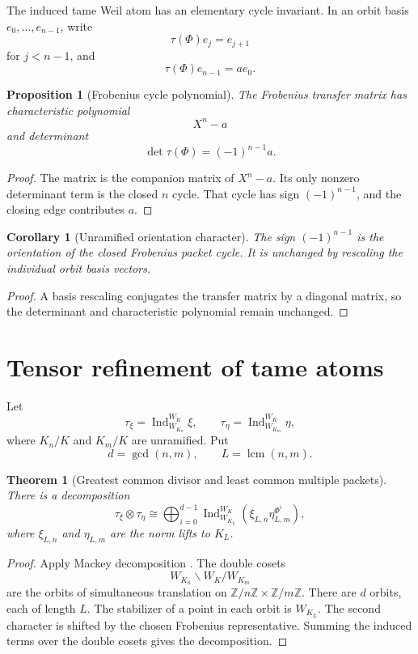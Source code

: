 \documentclass[11pt]{amsart}
\newtheorem{theorem}{Theorem}[section]
\newtheorem{proposition}[proposition]{Proposition}
\newtheorem{corollary}[corollary]{Corollary}
\theoremstyle{definition}
\theoremstyle{remark}
\newcommand{\ZZ}{\mathbb Z}
\newcommand{\Ind}{\operatorname{Ind}}
\newcommand{\lcm}{\operatorname{lcm}}
\begin{document}
The induced tame Weil atom has an elementary cycle invariant. In an orbit basis \(e_0,\ldots,e_{n-1}\), write
\[
\tau(\Phi)e_j=e_{j+1}
\]
for \(j<n-1\), and
\[
\tau(\Phi)e_{n-1}=ae_0.
\]

\begin{proposition}[Frobenius cycle polynomial]\label{prop:frobenius_cycle}
The Frobenius transfer matrix has characteristic polynomial
\[
X^n-a
\]
and determinant
\[
\boxed{
\det\tau(\Phi)=(-1)^{n-1}a.
}
\]
\end{proposition}

\begin{proof}
The matrix is the companion matrix of \(X^n-a\). Its only nonzero determinant term is the closed \(n\) cycle. That cycle has sign \((-1)^{n-1}\), and the closing edge contributes \(a\).
\end{proof}

\begin{corollary}[Unramified orientation character]\label{cor:orientation}
The sign \((-1)^{n-1}\) is the orientation of the closed Frobenius packet cycle. It is unchanged by rescaling the individual orbit basis vectors.
\end{corollary}

\begin{proof}
A basis rescaling conjugates the transfer matrix by a diagonal matrix, so the determinant and characteristic polynomial remain unchanged.
\end{proof}

\section{Tensor refinement of tame atoms}\label{sec:tensor}

Let
\[
\tau_\xi=\Ind_{W_{K_n}}^{W_K}\xi,
\qquad
\tau_\eta=\Ind_{W_{K_m}}^{W_K}\eta,
\]
where \(K_n/K\) and \(K_m/K\) are unramified. Put
\[
d=\gcd(n,m),
\qquad
L=\lcm(n,m).
\]

\begin{theorem}[Greatest common divisor and least common multiple packets]\label{thm:gcd_lcm}
There is a decomposition
\[
\boxed{
\tau_\xi\otimes\tau_\eta
\cong
\bigoplus_{i=0}^{d-1}
\Ind_{W_{K_L}}^{W_K}
\left(
\xi_{L,n}\eta_{L,m}^{\Phi^i}
\right),
}
\]
where \(\xi_{L,n}\) and \(\eta_{L,m}\) are the norm lifts to \(K_L\).
\end{theorem}

\begin{proof}
Apply Mackey decomposition \cite{Mackey1952}. The double cosets
\[
W_{K_n}\backslash W_K/W_{K_m}
\]
are the orbits of simultaneous translation on \(\ZZ/n\ZZ\times\ZZ/m\ZZ\). There are \(d\) orbits, each of length \(L\). The stabilizer of a point in each orbit is \(W_{K_L}\). The second character is shifted by the chosen Frobenius representative. Summing the induced terms over the double cosets gives the decomposition.
\end{proof}
\end{document}
